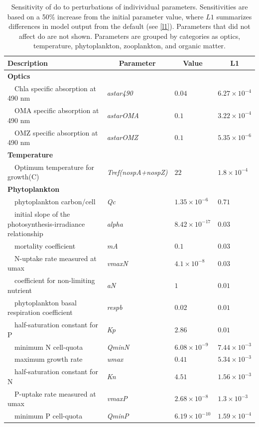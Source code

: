 \documentclass[letterpaper,12pt,oneside]{article}\usepackage[]{graphicx}\usepackage[]{color}
\begin{document}
\begin{table}[!tbp]
{\footnotesize
\caption{Sensitivity of \ac{do} to perturbations of indivividual parameters.  Sensitivities are based on a 50\% increase from the initial parameter value, where $L1$ summarizes differences in model output from the default (see \cref{l1}).  Parameters that did not affect \ac{do} are not shown.  Parameters are grouped by categories as optics, temperature, phytoplankton, zooplankton, and organic matter.\label{tab:dosens}} 
\begin{center}
\begin{tabular}{llll}
\hline\hline
\multicolumn{1}{l}{Description}&\multicolumn{1}{c}{Parameter}&\multicolumn{1}{c}{Value}&\multicolumn{1}{c}{L1}\tabularnewline
\hline
{\bfseries Optics}&&&\tabularnewline
~~Chla specific absorption at 490 nm&\textit{astar490}&$0.04$&$6.27\times 10^{-4}$\tabularnewline
~~OMA specific absorption at 490 nm&\textit{astarOMA}&$0.1$&$3.22\times 10^{-4}$\tabularnewline
~~OMZ specific absorption at 490 nm&\textit{astarOMZ}&$0.1$&$5.35\times 10^{-6}$\tabularnewline
\hline
{\bfseries Temperature}&&&\tabularnewline
~~Optimum temperature for growth(C)&\textit{Tref(nospA+nospZ)}&$22$&$1.8\times 10^{-4}$\tabularnewline
\hline
{\bfseries Phytoplankton}&&&\tabularnewline
~~phytoplankton carbon/cell&\textit{Qc}&$1.35\times 10^{-6}$&$0.71$\tabularnewline
~~initial slope of the photosynthesis-irradiance relationship&\textit{alpha}&$8.42\times 10^{-17}$&$0.03$\tabularnewline
~~mortality coefficient&\textit{mA}&$0.1$&$0.03$\tabularnewline
~~N-uptake rate measured at umax&\textit{vmaxN}&$4.1\times 10^{-8}$&$0.03$\tabularnewline
~~coefficient for non-limiting nutrient&\textit{aN}&$1$&$0.01$\tabularnewline
~~phytoplankton basal respiration coefficient&\textit{respb}&$0.02$&$0.01$\tabularnewline
~~half-saturation constant for P&\textit{Kp}&$2.86$&$0.01$\tabularnewline
~~minimum N cell-quota&\textit{QminN}&$6.08\times 10^{-9}$&$7.44\times 10^{-3}$\tabularnewline
~~maximum growth rate&\textit{umax}&$0.41$&$5.34\times 10^{-3}$\tabularnewline
~~half-saturation constant for N&\textit{Kn}&$4.51$&$1.56\times 10^{-3}$\tabularnewline
~~P-uptake rate measured at umax&\textit{vmaxP}&$2.68\times 10^{-8}$&$1.3\times 10^{-3}$\tabularnewline
~~minimum P cell-quota&\textit{QminP}&$6.19\times 10^{-10}$&$1.59\times 10^{-4}$\tabularnewline

\end{tabular}
\end{center}}
\end{table}
\end{document}
